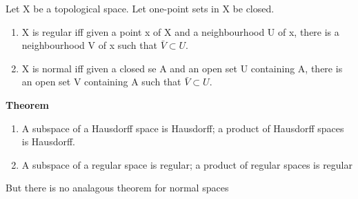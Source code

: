 \documentclass[11pt]{article}
\begin{document}
Let X be a topological space. Let one-point sets in X be closed.

\begin{enumerate}
\item X is regular iff given a point x of X and a neighbourhood U of x, there is a neighbourhood V of x such that \(\bar{V}\subset U\).
\item X is normal iff given a closed se A and an open set U containing A, there is an open set V containing A such that \(\bar{V} \subset U\).
\end{enumerate}


\textbf{Theorem}

\begin{enumerate}
\item A subspace of a Hausdorff space is Hausdorff; a product of Hausdorff spaces is Hausdorff.
\item A subspace of a regular space is regular; a product of regular spaces is regular
\end{enumerate}

But there is no analagous theorem for normal spaces
\end{document}

